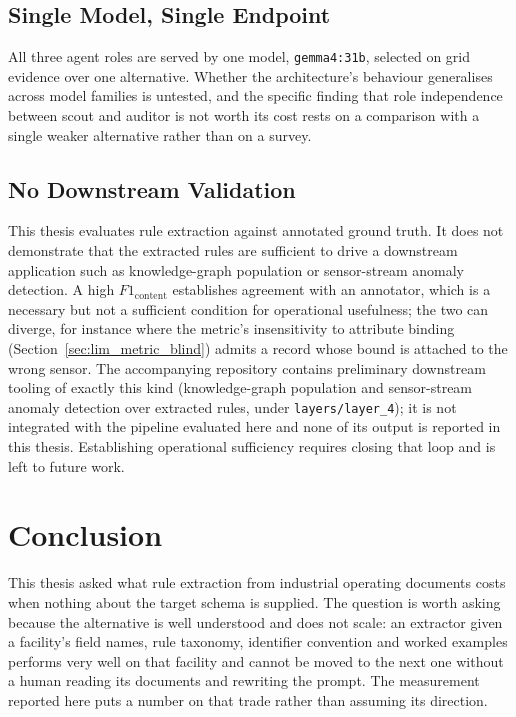 \documentclass[11pt]{article}
\begin{document}
\subsection{Single Model, Single Endpoint}
\label{sec:lim_model}
All three agent roles are served by one model, \texttt{gemma4:31b}, selected on
grid evidence over one alternative. Whether the architecture's behaviour
generalises across model families is untested, and the specific finding that
role independence between scout and auditor is not worth its cost rests on a
comparison with a single weaker alternative rather than on a survey.

\subsection{No Downstream Validation}
\label{sec:lim_downstream}
This thesis evaluates rule extraction against annotated ground truth. It does not
demonstrate that the extracted rules are sufficient to drive a downstream
application such as knowledge-graph population or sensor-stream anomaly
detection. A high $F1_{\text{content}}$ establishes agreement with an annotator,
which is a necessary but not a sufficient condition for operational usefulness;
the two can diverge, for instance where the metric's insensitivity to attribute
binding (Section~\ref{sec:lim_metric_blind}) admits a record whose bound is
attached to the wrong sensor. The accompanying repository contains preliminary
downstream tooling of exactly this kind (knowledge-graph population and
sensor-stream anomaly detection over extracted rules, under
\texttt{layers/layer\_4}); it is not integrated with the pipeline evaluated
here and none of its output is reported in this thesis. Establishing
operational sufficiency requires closing that loop and is left to future work.


\section{Conclusion}
\label{sec:conclusion}
This thesis asked what rule extraction from industrial operating documents costs
when nothing about the target schema is supplied. The question is worth asking
because the alternative is well understood and does not scale: an extractor given
a facility's field names, rule taxonomy, identifier convention and worked
examples performs very well on that facility and cannot be moved to the next one
without a human reading its documents and rewriting the prompt. The measurement
reported here puts a number on that trade rather than assuming its direction.
\end{document}
